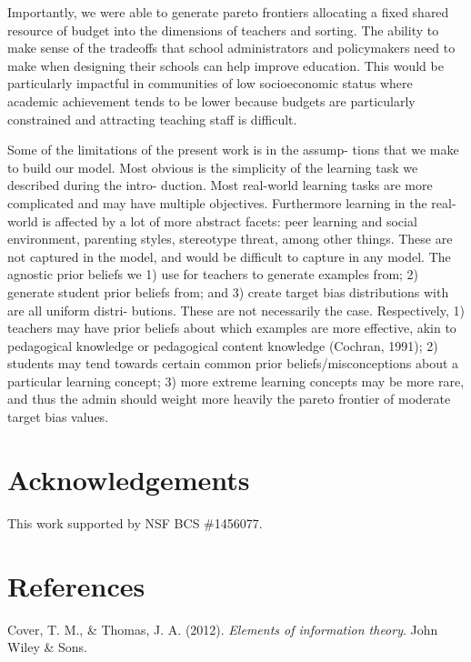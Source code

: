 \documentclass[10pt, letterpaper]{article}
\begin{document}
Importantly, we were able to generate pareto frontiers allocating a
fixed shared resource of budget into the dimensions of teachers and
sorting. The ability to make sense of the tradeoffs that school
administrators and policymakers need to make when designing their
schools can help improve education. This would be particularly impactful
in communities of low socioeconomic status where academic achievement
tends to be lower because budgets are particularly constrained and
attracting teaching staff is difficult.

Some of the limitations of the present work is in the assump- tions that
we make to build our model. Most obvious is the simplicity of the
learning task we described during the intro- duction. Most real-world
learning tasks are more complicated and may have multiple objectives.
Furthermore learning in the real-world is affected by a lot of more
abstract facets: peer learning and social environment, parenting styles,
stereotype threat, among other things. These are not captured in the
model, and would be difficult to capture in any model. The agnostic
prior beliefs we 1) use for teachers to generate examples from; 2)
generate student prior beliefs from; and 3) create target bias
distributions with are all uniform distri- butions. These are not
necessarily the case. Respectively, 1) teachers may have prior beliefs
about which examples are more effective, akin to pedagogical knowledge
or pedagogical content knowledge (Cochran, 1991); 2) students may tend
towards certain common prior beliefs/misconceptions about a particular
learning concept; 3) more extreme learning concepts may be more rare,
and thus the admin should weight more heavily the pareto frontier of
moderate target bias values.

\section{Acknowledgements}\label{acknowledgements}

This work supported by NSF BCS \#1456077.

\section{References}\label{references}

\setlength{\parindent}{-0.1in} \setlength{\leftskip}{0.125in} \noindent

\hypertarget{refs}{}
\hypertarget{ref-cover2012}{}
Cover, T. M., \& Thomas, J. A. (2012). \emph{Elements of information
theory}. John Wiley \& Sons.
\end{document}
